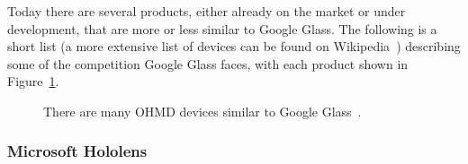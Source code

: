 Today there are several products, either already on the market or under development, that are more or less similar to Google Glass. The following is a short list (a more extensive list of devices can be found on Wikipedia~\cite{ohmdWiki}) describing some of the competition Google Glass faces, with each product shown in Figure~\ref{imagesSimilarProducts}. 

	\begin{figure}[H]%
		\centering
    \qquad
    \qquad
    \qquad
    \qquad
		\caption{There are many OHMD devices similar to Google Glass~\cite{ohmdWiki}.}
		\label{imagesSimilarProducts}
	\end{figure}
	

\subsubsection{Microsoft Hololens}

